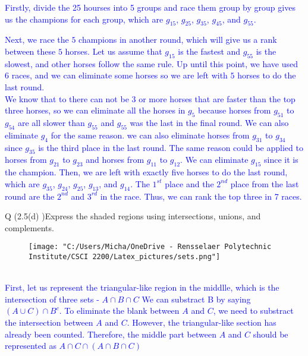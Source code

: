 \documentclass{article}
\begin{document}
\begin{addmargin}[2em]{2em}
	\textcolor{blue}{
	\quad Firstly, divide the 25 hourses into 5 groups and race them group by group gives us the champions for each group, which are $g_{15}$, $g_{25}$, $g_{35}$, $g_{45}$, and $g_{55}$.}

	\textcolor{blue}{
 Next, we race the $5$ champions in another round, which will give us a rank between these $5$ horses. Let us assume that $g_{15}$ is the fastest and $g_{55}$ is the slowest, and other horses follow the same rule. Up until this point, we have used 6 races, and we can eliminate some horses so we are left with $5$ horses to do the last round.\\
}
\textcolor{blue}{
  \quad We know that to there can not be 3 or more horses that are faster than the top three horses, so we can eliminate all the horses in $g_5$ because horses from $g_{51}$ to $g_{54}$ are all slower than $g_{55}$ and $g_{55}$ was the last in the final round. We can also eliminate $g_4$ for the same reason. we can also eliminate horses from $g_{31}$ to $g_{34}$ since $g_{35}$ is the third place in the last round. The same reason could be applied to horses from $g_{21}$ to $g_{23}$ and horses from $g_{11}$ to $g_{12}$.
We can eliminate $g_{15}$ since it is the champion. Then, we are left with exactly five horses to do the last round, which are $g_{35}$, $g_{24}$, $g_{25}$, $g_{13}$, and $g_{14}$. The $1^{st}$ place and the $2^{nd}$ place from the last round are the $2^{nd}$ and $3^{rd}$ in the race. Thus, we can rank the top three in 7 races.}
\end{addmargin}

\clearpage

\noindent Q (2.5(d) )Express the shaded regions using intersections, unions, and complements.
\begin{figure}[h]
	\centering
	\texttt{[image: "C:/Users/Micha/OneDrive - Rensselaer Polytechnic Institute/CSCI 2200/Latex\_pictures/sets.png"]}
\end{figure}
\\
\textcolor{blue}{
\indent First, let us represent the triangular-like region in the middlle, which is the intersection of three sets - $A \cap B \cap C$
	We can substract B by saying $(A \cup C) \cap B^c$. To eliminate the blank between $A$ and $C$, we need to substract the intersection between $A$ and $C$. However, the triangular-like section has already been counted. Therefore, the middle part between $A$ and $C$ should be represented as $A \cap C \cap (A \cap B \cap C)$}
	
\end{document}
